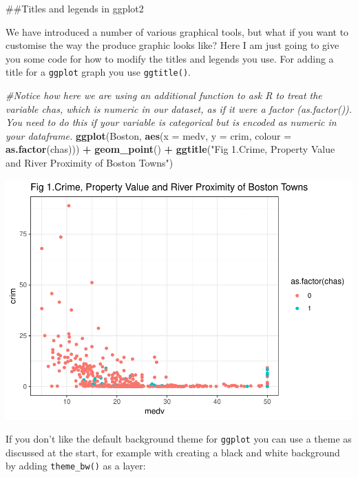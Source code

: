 \documentclass[]{book}
\newenvironment{Shaded}{\begin{snugshade}}{\end{snugshade}}
\newcommand{\CommentTok}[1]{\textcolor[rgb]{0.56,0.35,0.01}{\textit{#1}}}
\newcommand{\DataTypeTok}[1]{\textcolor[rgb]{0.13,0.29,0.53}{#1}}
\newcommand{\KeywordTok}[1]{\textcolor[rgb]{0.13,0.29,0.53}{\textbf{#1}}}
\newcommand{\NormalTok}[1]{#1}
\newcommand{\OperatorTok}[1]{\textcolor[rgb]{0.81,0.36,0.00}{\textbf{#1}}}
\newcommand{\StringTok}[1]{\textcolor[rgb]{0.31,0.60,0.02}{#1}}
\theoremstyle{definition}
\theoremstyle{definition}
\theoremstyle{definition}
\theoremstyle{remark}
\begin{document}
\#\#Titles and legends in ggplot2

We have introduced a number of various graphical tools, but what if you
want to customise the way the produce graphic looks like? Here I am just
going to give you some code for how to modify the titles and legends you
use. For adding a title for a \texttt{ggplot} graph you use
\texttt{ggtitle()}.

\begin{Shaded}
\begin{Highlighting}[]
\CommentTok{#Notice how here we are using an additional function to ask R to treat the variable chas, which is numeric in our dataset, as if it were a factor (as.factor()). You need to do this if your variable is categorical but is encoded as numeric in your dataframe.}
\KeywordTok{ggplot}\NormalTok{(Boston, }\KeywordTok{aes}\NormalTok{(}\DataTypeTok{x =}\NormalTok{ medv, }\DataTypeTok{y =}\NormalTok{ crim, }\DataTypeTok{colour =} \KeywordTok{as.factor}\NormalTok{(chas))) }\OperatorTok{+}
\StringTok{  }\KeywordTok{geom_point}\NormalTok{() }\OperatorTok{+}
\StringTok{  }\KeywordTok{ggtitle}\NormalTok{(}\StringTok{"Fig 1.Crime, Property Value and River Proximity of Boston Towns"}\NormalTok{)}
\end{Highlighting}
\end{Shaded}

\includegraphics{03-visualisation_files/figure-latex/unnamed-chunk-55-1.pdf}

If you don't like the default background theme for \texttt{ggplot} you
can use a theme as discussed at the start, for example with creating a
black and white background by adding \texttt{theme\_bw()} as a layer:
\end{document}
